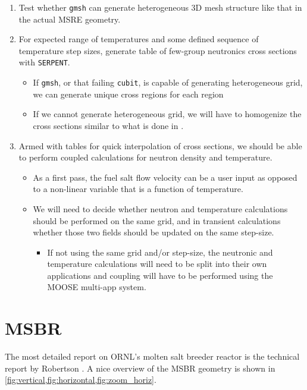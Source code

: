 \documentclass{article}
\let\Oldsection\section
\renewcommand{\section}{\FloatBarrier\Oldsection}
\newcommand{\code}[1]{\texttt{#1}}
\begin{document}
\begin{enumerate}
\item Test whether \code{gmsh} can generate heterogeneous 3D mesh structure
  like that in the actual \gls{MSRE} geometry.
\item For expected range of temperatures and some defined sequence of
  temperature step sizes, generate table of few-group neutronics cross sections
  with \code{SERPENT}.
  \begin{itemize}
    \item If \code{gmsh}, or that failing \code{cubit}, is capable of generating
      heterogeneous grid, we can generate unique cross regions for each region
    \item If we cannot generate heterogeneous grid, we will have to homogenize
      the cross sections similar to what is done in
      \cite{kophazi_development_2009}.
  \end{itemize}
\item Armed with tables for quick interpolation of cross sections, we should be
  able to perform coupled calculations for neutron density and
  temperature.
  \begin{itemize}
    \item As a first pass, the fuel salt flow velocity can be a user input as
      opposed to a non-linear variable that is a function of temperature.
    \item We will need to decide whether neutron and temperature calculations
      should be performed on the same grid, and in transient calculations
      whether those two fields should be updated on the same step-size.
      \begin{itemize}
        \item If not using the same grid and/or step-size, the neutronic and
          temperature calculations will need to be split into their own
          applications and coupling will have to be performed using the MOOSE
          multi-app system.
      \end{itemize}
  \end{itemize}
\end{enumerate}

\section{MSBR}

The most detailed report on \gls{ORNL}'s molten salt breeder reactor is the technical
report by Robertson \cite{robertson_conceptual_1971}. A nice overview of the
MSBR geometry is shown in \cref{fig:vertical,fig:horizontal,fig:zoom_horiz}.
\end{document}
